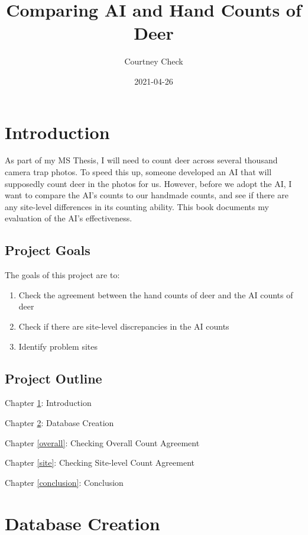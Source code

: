 \documentclass[
]{book}
\title{Comparing AI and Hand Counts of Deer}
\author{Courtney Check}
\date{2021-04-26}
\providecommand{\tightlist}{%
  \setlength{\itemsep}{0pt}\setlength{\parskip}{0pt}}
\begin{document}
\maketitle

{
\setcounter{tocdepth}{1}
\tableofcontents
}
\hypertarget{introduction}{%
\chapter{Introduction}\label{introduction}}

As part of my MS Thesis, I will need to count deer across several thousand camera trap photos. To speed this up, someone developed an AI that will supposedly count deer in the photos for us. However, before we adopt the AI, I want to compare the AI's counts to our handmade counts, and see if there are any site-level differences in its counting ability. This book documents my evaluation of the AI's effectiveness.

\hypertarget{project-goals}{%
\section{Project Goals}\label{project-goals}}

The goals of this project are to:

\begin{enumerate}
\def\labelenumi{\arabic{enumi}.}
\tightlist
\item
  Check the agreement between the hand counts of deer and the AI counts of deer
\item
  Check if there are site-level discrepancies in the AI counts
\item
  Identify problem sites
\end{enumerate}

\hypertarget{project-outline}{%
\section{Project Outline}\label{project-outline}}

Chapter \ref{introduction}: Introduction

Chapter \ref{database}: Database Creation

Chapter \ref{overall}: Checking Overall Count Agreement

Chapter \ref{site}: Checking Site-level Count Agreement

Chapter \ref{conclusion}: Conclusion

\hypertarget{database}{%
\chapter{Database Creation}\label{database}}
\end{document}
